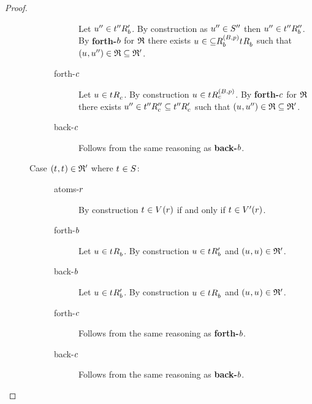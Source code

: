 \begin{proof}
\begin{description}
\begin{description}
\begin{description}
                        Let ${u}^{\prime\prime} \in {{t}^{\prime\prime}} {R^{\prime}_{b}}$.
                        By construction as ${u}^{\prime\prime} \in {S^{\prime\prime}}$ then ${u}^{\prime\prime} \in {{t}^{\prime\prime}} {R^{\prime\prime}_{b}}$.
                        By {\bf forth-$b$} for $\mathfrak{R}$ there exists $\kStateU \in \kSuccessorsB[(\agentsB, \atomP)] \subseteq \kSuccessorsB{\kStateT}$ such that $(\kStateU, \kStateUPP) \in \bisimulation \subseteq \bisimulation'$.
                    \item[forth-$c$]
                        Let $\kStateU \in \kSuccessorsC{\kStateT}$.
                        By construction $\kStateU \in \kSuccessorsC[(\agentsB, \atomP)]{\kStateT}$.
                        By {\bf forth-$c$} for $\mathfrak{R}$ there exists ${u}^{\prime\prime} \in {{t}^{\prime\prime}} {R^{\prime\prime}_{c}} \subseteq {{t}^{\prime\prime}} {R^{\prime}_{c}}$ such that $(\kStateU, \kStateUPP) \in \bisimulation \subseteq \bisimulation'$.
                    \item[back-$c$]
                        Follows from the same reasoning as {\bf back-$b$}.
                \end{description}
            \item[{Case $(\kStateT, \kStateT) \in \bisimulation'$ where $\kStateT \in \kStates$:}]
                \hfill
                \begin{description}
                    \item[atoms-$r$] 
                        By construction $\kStateT \in \kValuation(\atomR)$ if and only if $\kStateT \in \kValuationP(\atomR)$.
                    \item[forth-$b$]
                        Let $\kStateU \in \kSuccessorsB{\kStateT}$.
                        By construction $\kStateU \in \kSuccessorsPB{\kStateT}$ and $(\kStateU, \kStateU) \in \bisimulation'$.
                    \item[back-$b$]
                        Let $\kStateU \in \kSuccessorsPB{\kStateT}$.
                        By construction $\kStateU \in \kSuccessorsB{\kStateT}$ and $(\kStateU, \kStateU) \in \bisimulation'$.
                    \item[forth-$c$]
                        Follows from the same reasoning as {\bf forth-$b$}.
                    \item[back-$c$]
                        Follows from the same reasoning as {\bf back-$b$}.
                \end{description}
        \end{description}


\end{description}
\end{proof}
